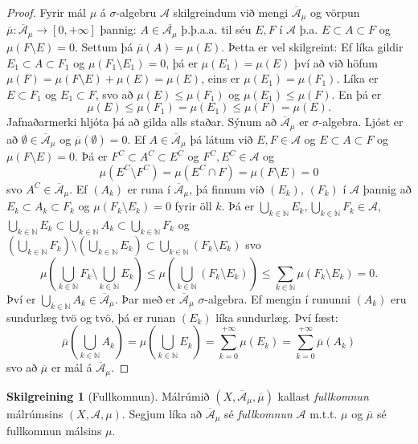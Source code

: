\documentclass[a4paper,icelandic,11pt]{book}
\theoremstyle{plain}      \newtheorem{setn}{Setning}[chapter]
\theoremstyle{definition} \newtheorem{skilgr}[setn]{Skilgreining}
\theoremstyle{remark}     \newtheorem*{ath}{Athugasemd}
\newcommand{\N}{\mathbb N}
\begin{document}

\begin{proof}
  Fyrir mál $\mu$ á $\sigma$-algebru $\mathcal A$ skilgreindum við
  mengi $\overline{\mathcal A}_{\mu}$ og vörpun
  $\overline\mu:\overline{\mathcal{A}}_{\mu}\to[0,+\infty]$ þannig:
  $A\in\overline{\mathcal A_{\mu}}$ þ.þ.a.a. til séu $E,F$ í
  $\mathcal{A}$ þ.a. $E\subset A\subset F$ og
  $\mu(F\setminus{E})=0$. Settum þá $\overline\mu(A)=\mu(E)$. Þetta er
  vel skilgreint: Ef líka gildir $E_{1}\subset{A}\subset{F_{1}}$ og
  $\mu(F_{1}\setminus{E_{1}})=0$, þá er $\mu(E_{1})=\mu(E)$ því að við
  höfum $\mu(F)=\mu(F\setminus{E})+\mu(E)=\mu(E)$, eins er
  $\mu(E_{1})=\mu(F_{1})$. Líka er $E\subset F_{1}$ og
  $E_{1}\subset{F}$, svo að $\mu(E)\le\mu(F_{1})$ og
  $\mu(E_{1})\le\mu(F)$. En þá er
  \[
  \mu(E)\le\mu(F_{1})=\mu(E_{1})\le\mu(F)=\mu(E).
  \]
  Jafnaðarmerki hljóta þá að gilda alls staðar. Sýnum að
  $\overline{\mathcal A}_{\mu}$ er $\sigma$-algebra. Ljóst er að
  $\emptyset\in\overline{\mathcal A}_{\mu}$ og
  $\overline\mu(\emptyset)=0$. Ef $A\in\overline{\mathcal A}_{\mu}$ þá
  látum við $E,F\in\mathcal A$ og $E\subset A\subset F$ og
  $\mu(F\setminus{E})=0$. Þá er $F^{C}\subset{A^{C}}\subset{E^{C}}$ og
  $F^{C},E^{C}\in\mathcal{A}$ og
  \[
  \mu(E^{C}\setminus F^{C}) = \mu(E^{C}\cap F) = \mu(F\setminus E) = 0
  \]
  svo $A^{C}\in\overline{\mathcal A}_{\mu}$. Ef $(A_{k})$ er runa í
  $\overline{\mathcal A}_{\mu}$, þá finnum við $(E_{k})$, $(F_{k})$ í
  $\mathcal A$ þannig að $E_{k}\subset A_{k}\subset F_{k}$ og
  $\mu(F_{k}\setminus E_{k})=0$ fyrir öll $k$. Þá er
  $\bigcup_{k\in\N}E_{k},\bigcup_{k\in\N}F_{k}\in\mathcal{A}$,
  $\bigcup_{k\in\N}E_{k}\subset\bigcup_{k\in\N}A_{k}\subset\bigcup_{k\in\N}F_{k}$
  og
  $(\bigcup_{k\in\N}F_{k})\setminus(\bigcup_{k\in\N}E_{k})\subset\bigcup_{k\in\N}(F_{k}\setminus{E_{k}})$
  svo
  \[
  \mu(\bigcup_{k\in\N}F_{k}\setminus\bigcup_{k\in\N} E_{k})
  \le \mu(\bigcup_{k\in\N}(F_{k}\setminus E_{k}))
  \le \sum_{k\in\N}\mu(F_{k}\setminus E_{k})
  =0.
  \]
  Því er $\bigcup_{k\in\N}A_{k}\in\overline{\mathcal A}_{\mu}$. Þar
  með er $\overline{\mathcal A}_{\mu}$ $\sigma$-algebra. Ef mengin í
  rununni $(A_{k})$ eru sundurlæg tvö og tvö, þá er runan $(E_{k})$
  líka sundurlæg. Því fæst:
  \[
  \overline\mu(\bigcup_{k\in\N}A_{k})
  = \mu(\bigcup_{k\in\N}E_{k})
  = \sum_{k=0}^{+\infty}\mu(E_{k})
  = \sum_{k=0}^{+\infty}\overline\mu(A_{k})
  \]
  svo að $\overline\mu$ er mál á $\overline{\mathcal A}_{\mu}$.
\end{proof}
\begin{skilgr}[Fullkomnun]
  Málrúmið $(X,\overline{\mathcal A}_{\mu},\overline\mu)$ kallast
  \emph{fullkomnun} málrúmsins $(X,\mathcal{A},\mu)$. Segjum líka að
  $\overline{\mathcal{A}}_{\mu}$ sé \emph{fullkomnun} $\mathcal A$
  m.t.t. $\mu$ og $\overline\mu$ sé fullkomnun málsins $\mu$.
\end{skilgr}
\end{document}
